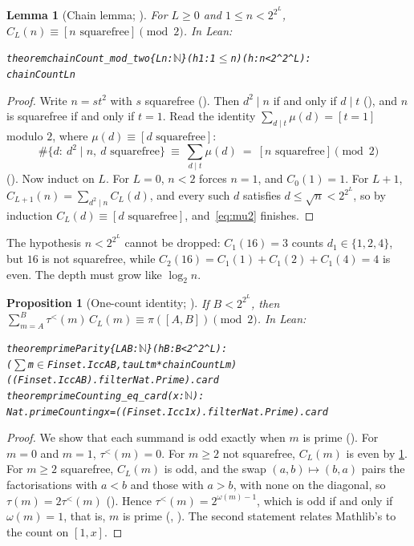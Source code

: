 \documentclass[10pt]{amsart}
\theoremstyle{plain}
\newtheorem{lemma}[theorem]{Lemma}
\newtheorem{proposition}[theorem]{Proposition}
\theoremstyle{definition}
\theoremstyle{remark}
\numberwithin{equation}{section}
\newcommand{\tl}{\tau^{<}}
\begin{document}
\begin{lemma}[Chain lemma; ]\label{lem:chain}
For $L\ge0$ and $1\le n<2^{2^L}$, $C_L(n)\equiv[n\text{ squarefree}]\pmod2$. In Lean:
\begin{alltt}\footnotesize
theorem chainCount_mod_two \{L n : \(\mathbb{N}\)\} (h1 : 1 \(\le\) n) (h : n < 2 ^ 2 ^ L) :
    chainCount L n %
\end{alltt}
\end{lemma}

\begin{proof}
Write $n=st^2$ with $s$ squarefree (). Then $d^2\mid n$ if and only
if $d\mid t$ (), and $n$ is squarefree if and only if $t=1$. Read the identity
$\sum_{d\mid t}\mu(d)=[t=1]$ modulo $2$, where $\mu(d)\equiv[d\text{ squarefree}]$:
\begin{equation}\label{eq:mu2}
  \#\{d:\ d^2\mid n,\ d\text{ squarefree}\}\ \equiv\ \sum_{d\mid t}\mu(d)\ =\ [n\text{ squarefree}]\pmod 2
\end{equation}
(). Now induct on $L$. For $L=0$, $n<2$ forces $n=1$, and $C_0(1)=1$. For $L+1$,
$C_{L+1}(n)=\sum_{d^2\mid n}C_L(d)$, and every such $d$ satisfies $d\le\sqrt n<2^{2^L}$, so by induction
$C_L(d)\equiv[d\text{ squarefree}]$, and~\eqref{eq:mu2} finishes.
\end{proof}

\noindent The hypothesis $n<2^{2^L}$ cannot be dropped: $C_1(16)=3$ counts $d_1\in\{1,2,4\}$, but $16$
is not squarefree, while $C_2(16)=C_1(1)+C_1(2)+C_1(4)=4$ is even. The depth must grow like $\log_2 n$.

\begin{proposition}[One-count identity; ]\label{prop:onecount}
If $B<2^{2^L}$, then $\sum_{m=A}^{B}\tl(m)\,C_L(m)\equiv\pi([A,B])\pmod2$. In Lean:
\begin{alltt}\footnotesize
theorem primeParity \{L A B : \(\mathbb{N}\)\} (hB : B < 2 ^ 2 ^ L) :
    (\(\sum\) m \(\in\) Finset.Icc A B, tauLt m * chainCount L m) %
      ((Finset.Icc A B).filter Nat.Prime).card %
theorem primeCounting_eq_card (x : \(\mathbb{N}\)) :
    Nat.primeCounting x = ((Finset.Icc 1 x).filter Nat.Prime).card
\end{alltt}
\end{proposition}

\begin{proof}
We show that each summand is odd exactly when $m$ is prime (). For $m=0$ and $m=1$,
$\tl(m)=0$. For $m\ge2$ not squarefree, $C_L(m)$ is even by \cref{lem:chain}. For $m\ge2$ squarefree,
$C_L(m)$ is odd, and the swap $(a,b)\mapsto(b,a)$ pairs the factorisations with $a<b$ and those with
$a>b$, with none on the diagonal, so $\tau(m)=2\tl(m)$ (). Hence
$\tl(m)=2^{\omega(m)-1}$, which is odd if and only if $\omega(m)=1$, that is, $m$ is prime
(, ). The second statement relates Mathlib's 
to the count on $[1,x]$.
\end{proof}
\end{document}
